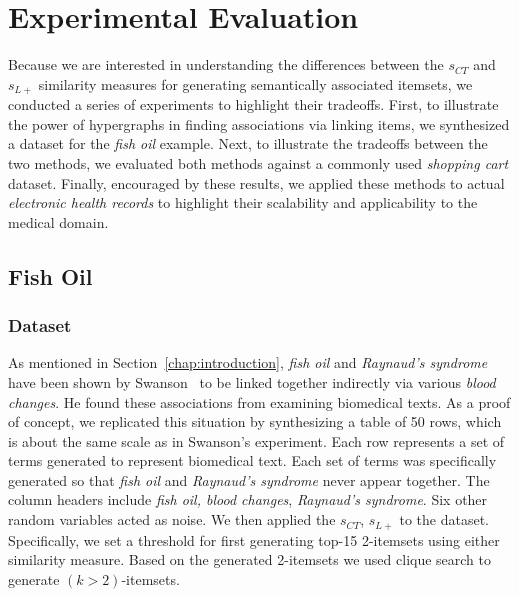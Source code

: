 \section{Experimental Evaluation}
\label{experiment}
Because we are interested in understanding the differences between the $s_{CT}$ and $s_{L+}$ similarity measures for generating semantically associated itemsets, we conducted a series of experiments to highlight their tradeoffs.  First, to illustrate the power of hypergraphs in finding associations via linking items, we synthesized a dataset for the \emph{fish oil} example.  Next, to illustrate the tradeoffs between the two methods, we evaluated both methods against a commonly used \emph{shopping cart} dataset.  Finally, encouraged by these results, we applied these methods to actual \emph{electronic health records} to highlight their scalability and applicability to the medical domain.


\subsection{Fish Oil}
\subsubsection{Dataset}
As mentioned in Section~\ref{chap:introduction}, \emph{fish oil} and \emph{Raynaud's syndrome} have been shown by Swanson~\cite{swanson87} to be linked together indirectly via various \emph{blood changes}.  He found these associations from examining biomedical texts.  As a proof of concept, we replicated this situation by synthesizing a table of 50 rows, which is about the same scale as in Swanson's experiment.  Each row represents a set of terms generated to represent biomedical text.   Each set of terms was specifically generated so that \emph{fish oil} and \emph{Raynaud's syndrome} never appear together. The column headers include \emph{fish oil, blood changes}, \emph{Raynaud's syndrome}.  Six other random variables acted as noise.  We then applied the $s_{CT}$, $s_{L+}$ to the dataset. Specifically, we set a threshold for first generating top-15 2-itemsets using either similarity measure. Based on the generated 2-itemsets we used clique search to generate $(k>2)$-itemsets.

